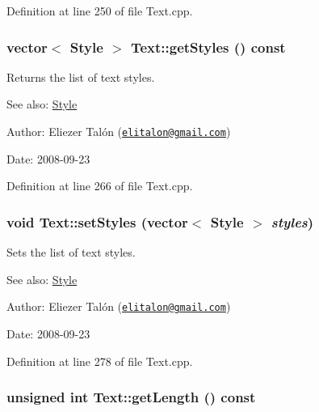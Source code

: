 Definition at line 250 of file Text.cpp.\hypertarget{class_text_5d0279f5ce832a447c68b99182753928}{
\subsubsection[getStyles]{\setlength{\rightskip}{0pt plus 5cm}vector$<$ {\bf Style} $>$ Text::getStyles () const}}
\label{class_text_5d0279f5ce832a447c68b99182753928}


Returns the list of text styles. 

\begin{Desc}
\item[See also:]\hyperlink{class_style}{Style}\end{Desc}
\begin{Desc}
\item[Author:]Eliezer Talón (\href{mailto:elitalon@gmail.com}{\tt elitalon@gmail.com}) \end{Desc}
\begin{Desc}
\item[Date:]2008-09-23 \end{Desc}


Definition at line 266 of file Text.cpp.\hypertarget{class_text_419c845399aa5e49e3271600fc8a812d}{
\subsubsection[setStyles]{\setlength{\rightskip}{0pt plus 5cm}void Text::setStyles (vector$<$ {\bf Style} $>$ {\em styles})}}
\label{class_text_419c845399aa5e49e3271600fc8a812d}


Sets the list of text styles. 

\begin{Desc}
\item[See also:]\hyperlink{class_style}{Style}\end{Desc}
\begin{Desc}
\item[Author:]Eliezer Talón (\href{mailto:elitalon@gmail.com}{\tt elitalon@gmail.com}) \end{Desc}
\begin{Desc}
\item[Date:]2008-09-23 \end{Desc}


Definition at line 278 of file Text.cpp.\hypertarget{class_text_ea91ea415ed40d6cd0aff9063d72756e}{
\subsubsection[getLength]{\setlength{\rightskip}{0pt plus 5cm}unsigned int Text::getLength () const}}
\label{class_text_ea91ea415ed40d6cd0aff9063d72756e}


